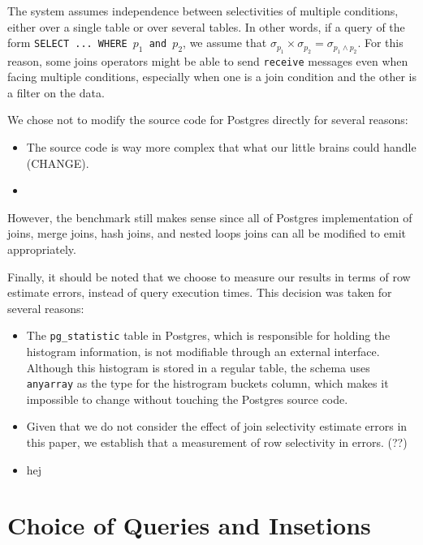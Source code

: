 \documentclass[twocolumn]{article}
\begin{document}
The system assumes independence between selectivities of multiple conditions, either over a single table or over several tables. In other words, if a query of the form \texttt{SELECT ... WHERE $p_1$ and $p_2$}, we assume that $\sigma_{p_1} \times \sigma_{p_2} = \sigma_{p_1 \land p_2}$.  For this reason, some joins operators might be able to send \texttt{receive}
messages even when facing multiple conditions, especially when one is a join condition and the other is a filter on
the data.

We chose not to modify the source code for Postgres directly for several reasons:

\begin{itemize}
	\item The source code is way more complex that what our little brains could handle (CHANGE).
	\item  
\end{itemize}

However, the benchmark still makes sense since all of Postgres implementation of joins, merge joins, hash joins, and nested loops joins can all be modified to emit appropriately.

Finally, it should be noted that we choose to measure our results in terms of row estimate errors, instead of query execution times. This decision was taken for several reasons:

\begin{itemize}	
	\item The \texttt{pg\_statistic} table in Postgres, which is responsible for holding
		the histogram information, is not modifiable through an external interface. Although
		this histogram is stored in a regular table, the schema uses \texttt{anyarray} as the type
		for the histrogram buckets column, which makes it impossible to change without touching
		the Postgres source code.
		
	\item Given that we do not consider the effect of join selectivity estimate errors in this paper,
		we establish that a measurement of row selectivity in errors. (??)
	
	\item hej
	
\end{itemize}

\section{Choice of Queries and Insetions}\label{choice-queries}
\end{document}
